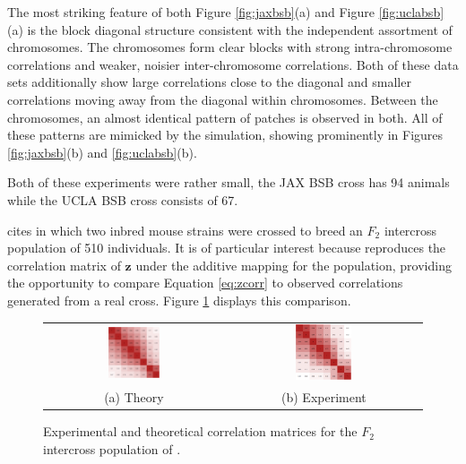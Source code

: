 \documentclass{article}
\newcommand{\ve}[1]{\mathbf{#1}}           %
\begin{document}
The most striking feature of both Figure \ref{fig:jaxbsb}(a) and Figure \ref{fig:uclabsb}(a) is the block diagonal structure consistent with the independent assortment of chromosomes. The chromosomes form clear blocks with strong intra-chromosome correlations and weaker, noisier inter-chromosome correlations. Both of these data sets additionally show large correlations close to the diagonal and smaller correlations moving away from the diagonal within chromosomes. Between the chromosomes, an almost identical pattern of patches is observed in both. All of these patterns are mimicked by the simulation, showing prominently in Figures \ref{fig:jaxbsb}(b) and \ref{fig:uclabsb}(b).

Both of these experiments were rather small, the JAX BSB cross has 94 animals while the UCLA BSB cross consists of 67.

\cite{cheverud2001} cites \cite{cheverudetal2001} in which two inbred mouse strains were crossed to breed an $F_2$ intercross population of 510 individuals. It is of particular interest because \cite{cheverud2001} reproduces the correlation matrix of $\ve{z}$ under the additive mapping for the population, providing the opportunity to compare Equation \ref{eq:zcorr} to observed correlations generated from a real cross. Figure \ref{fig:corr2real} displays this comparison.

\begin{figure}[htp]
  \begin{center}
    \begin{tabular}{cc}
      \includegraphics[width = 0.300\textwidth]{./img/chevCorrTheory.png} &
      \includegraphics[width = 0.300\textwidth]{./img/chevCorr.png} \\
      {\footnotesize (a) Theory} &
      {\footnotesize (b) Experiment} \\
    \end{tabular}
  \end{center}
  \caption{Experimental and theoretical correlation matrices for the $F_2$ intercross population of \cite{cheverudetal2001}.}
  \label{fig:corr2real}
\end{figure}
\end{document}
